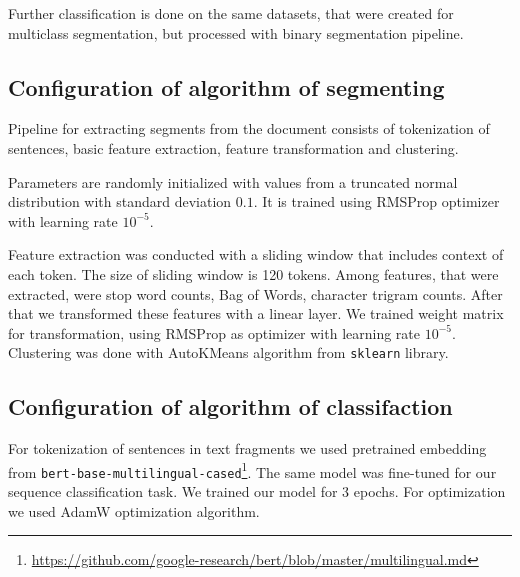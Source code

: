 \documentclass{article}
\begin{document}
Further classification is done on the same datasets, that were created for multiclass segmentation, but processed with binary segmentation pipeline.



\subsection{Configuration of algorithm of segmenting}

Pipeline for extracting segments from the document consists of tokenization of sentences, basic feature extraction, feature transformation and clustering. 

Parameters are randomly initialized with values from a truncated normal distribution with standard deviation $0.1$. It is trained using RMSProp optimizer with learning rate $10^{-5}$.

Feature extraction was conducted with a sliding window that includes context of each token. The size of sliding window is 120 tokens. Among features, that were extracted, were stop word counts, Bag of Words, character trigram counts. After that we transformed these features with a linear layer. We trained weight matrix for transformation, using RMSProp as optimizer with learning rate $10^{-5}$. Clustering was done with AutoKMeans algorithm from \texttt{sklearn} library.

\subsection{Configuration of algorithm of classifaction}
For tokenization of sentences in text fragments we used pretrained embedding from \texttt{bert-base-multilingual-cased}\footnote{\url{https://github.com/google-research/bert/blob/master/multilingual.md}}. The same model was fine-tuned for our sequence classification task. We trained our model for 3 epochs. For optimization we used AdamW optimization algorithm\cite{adam-w}.
\end{document}
